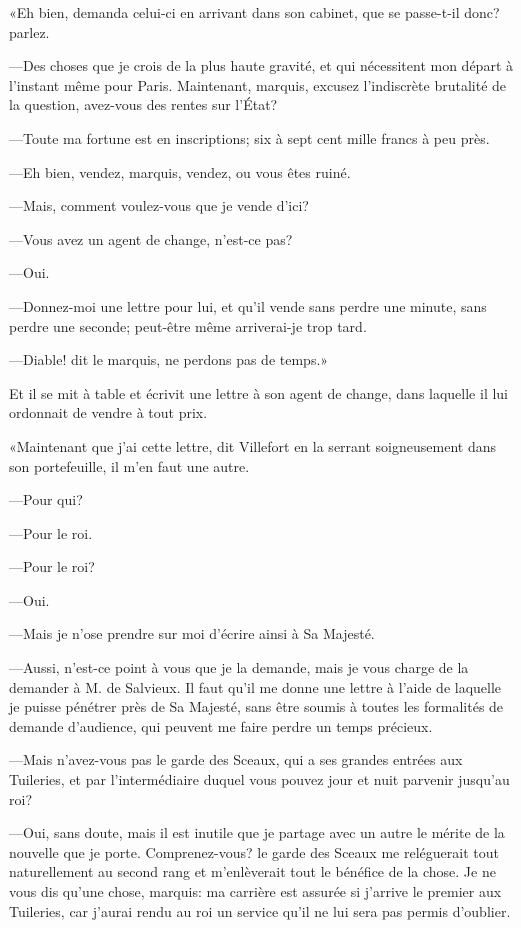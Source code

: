 «Eh bien, demanda celui-ci en arrivant dans son cabinet, que se passe-t-il donc? parlez.

—Des choses que je crois de la plus haute gravité, et qui nécessitent mon départ à l'instant même pour Paris. Maintenant, marquis, excusez l'indiscrète brutalité de la question, avez-vous des rentes sur l'État?

—Toute ma fortune est en inscriptions; six à sept cent mille francs à peu près.

—Eh bien, vendez, marquis, vendez, ou vous êtes ruiné.

—Mais, comment voulez-vous que je vende d'ici?

—Vous avez un agent de change, n'est-ce pas?

—Oui.

—Donnez-moi une lettre pour lui, et qu'il vende sans perdre une minute, sans perdre une seconde; peut-être même arriverai-je trop tard.

—Diable! dit le marquis, ne perdons pas de temps.»

Et il se mit à table et écrivit une lettre à son agent de change, dans laquelle il lui ordonnait de vendre à tout prix.

«Maintenant que j'ai cette lettre, dit Villefort en la serrant soigneusement dans son portefeuille, il m'en faut une autre.

—Pour qui?

—Pour le roi.

—Pour le roi?

—Oui.

—Mais je n'ose prendre sur moi d'écrire ainsi à Sa Majesté.

—Aussi, n'est-ce point à vous que je la demande, mais je vous charge de la demander à M. de Salvieux. Il faut qu'il me donne une lettre à l'aide de laquelle je puisse pénétrer près de Sa Majesté, sans être soumis à toutes les formalités de demande d'audience, qui peuvent me faire perdre un temps précieux.

—Mais n'avez-vous pas le garde des Sceaux, qui a ses grandes entrées aux Tuileries, et par l'intermédiaire duquel vous pouvez jour et nuit parvenir jusqu'au roi?

—Oui, sans doute, mais il est inutile que je partage avec un autre le mérite de la nouvelle que je porte. Comprenez-vous? le garde des Sceaux me reléguerait tout naturellement au second rang et m'enlèverait tout le bénéfice de la chose. Je ne vous dis qu'une chose, marquis: ma carrière est assurée si j'arrive le premier aux Tuileries, car j'aurai rendu au roi un service qu'il ne lui sera pas permis d'oublier.

